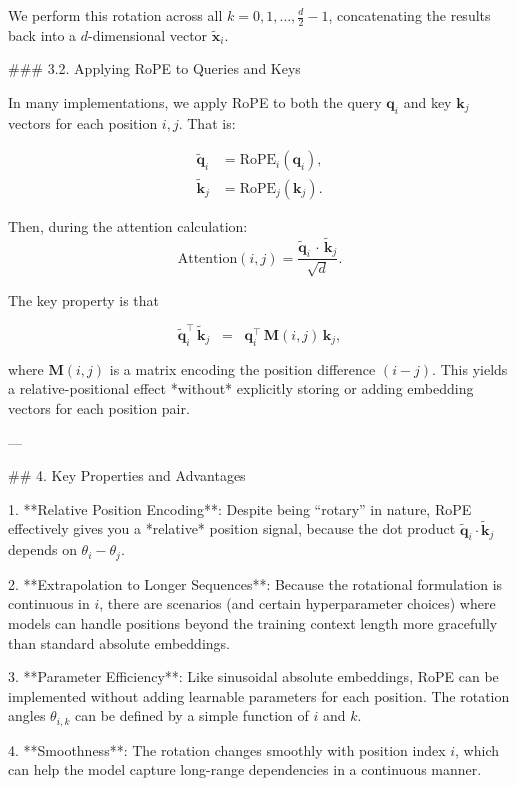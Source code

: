 We perform this rotation across all \(k = 0, 1, \dots, \frac{d}{2}-1\), concatenating the results back into a \(d\)-dimensional vector \(\tilde{\mathbf{x}}_i\).

### 3.2. Applying RoPE to Queries and Keys

In many implementations, we apply RoPE to both the query \(\mathbf{q}_i\) and key \(\mathbf{k}_j\) vectors for each position \(i, j\). That is:

\[
\begin{aligned}
\tilde{\mathbf{q}}_i &= \text{RoPE}_i(\mathbf{q}_i), \\
\tilde{\mathbf{k}}_j &= \text{RoPE}_j(\mathbf{k}_j).
\end{aligned}
\]

Then, during the attention calculation:
\[
\text{Attention}(i, j) 
= \frac{\tilde{\mathbf{q}}_i \,\cdot\, \tilde{\mathbf{k}}_j}{\sqrt{d}}.
\]

The key property is that

\[
\tilde{\mathbf{q}}_i^\top \, \tilde{\mathbf{k}}_j
\;\;=\;\;
\mathbf{q}_i^\top\, \mathbf{M}(i,j)\, \mathbf{k}_j,
\]

where \(\mathbf{M}(i,j)\) is a matrix encoding the position difference \((i-j)\). This yields a relative-positional effect *without* explicitly storing or adding embedding vectors for each position pair.

---

## 4. Key Properties and Advantages

1. **Relative Position Encoding**:  
   Despite being “rotary” in nature, RoPE effectively gives you a *relative* position signal, because the dot product \(\tilde{\mathbf{q}}_i \cdot \tilde{\mathbf{k}}_j\) depends on \(\theta_{i} - \theta_{j}\).

2. **Extrapolation to Longer Sequences**:  
   Because the rotational formulation is continuous in \(i\), there are scenarios (and certain hyperparameter choices) where models can handle positions beyond the training context length more gracefully than standard absolute embeddings.

3. **Parameter Efficiency**:  
   Like sinusoidal absolute embeddings, RoPE can be implemented without adding learnable parameters for each position. The rotation angles \(\theta_{i,k}\) can be defined by a simple function of \(i\) and \(k\).

4. **Smoothness**:  
   The rotation changes smoothly with position index \(i\), which can help the model capture long-range dependencies in a continuous manner.


